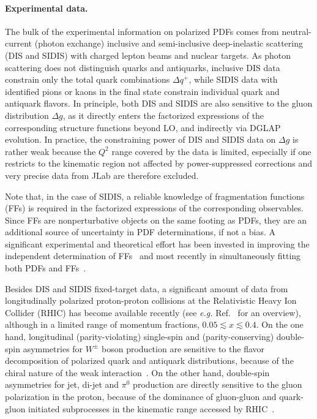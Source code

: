 \paragraph*{Experimental data.}
The bulk of the experimental information on polarized PDFs comes from 
neutral-current (photon exchange) inclusive and semi-inclusive deep-inelastic
scattering (DIS and SIDIS) with charged lepton beams and nuclear targets. 
%
As photon scattering does not distinguish quarks and antiquarks, inclusive DIS 
data constrain only the total quark combinations $\Delta q^+$, 
while SIDIS data with identified pions or kaons in the final state 
constrain individual quark and antiquark flavors. 
%
In principle, both DIS and SIDIS are also sensitive to the gluon 
distribution $\Delta g$, as it directly enters the factorized expressions of
the corresponding structure functions beyond LO, and indirectly via DGLAP 
evolution.
%
In practice, the constraining power of DIS and SIDIS data on $\Delta g$ is 
rather weak because the $Q^2$ range covered by the data is limited,
especially if one restricts to the kinematic region not affected by
power-suppressed corrections and very precise data from JLab are therefore
excluded. 

Note that, in the case of SIDIS, a reliable knowledge of fragmentation 
functions (FFs) is required in the factorized expressions of the 
corresponding observables. 
%
Since FFs are nonperturbative objects on the same footing as PDFs, they are 
an additional source of uncertainty in PDF determinations, if not a bias.
%
A significant experimental and theoretical effort has been
invested in improving the independent determination of 
FFs~\cite{deFlorian:2014xna,deFlorian:2017lwf,
Hirai:2016loo,Sato:2016wqj,Bertone:2017tyb} and most recently in simultaneously 
fitting both PDFs and FFs~\cite{Ethier:2017zbq,Borsa:2017vwy}.

Besides DIS and SIDIS fixed-target data, a significant amount of data from
longitudinally polarized proton-proton collisions at the Relativistic 
Heavy Ion Collider (RHIC) has become available recently (see {\it e.g.} 
Ref.~\cite{Aschenauer:2015eha} for an overview), although in a limited range 
of momentum fractions, $0.05\lesssim x \lesssim 0.4$.
%
On the one hand, longitudinal (parity-violating) single-spin and 
(parity-conserving) double-spin asymmetries for $W^\pm$ boson production are 
sensitive to the flavor decomposition of polarized quark and antiquark 
distributions, because of the chiral nature of the weak 
interaction~\cite{Bourrely:1993dd}. 
%
On the other hand, double-spin asymmetries for jet, di-jet and $\pi^0$ 
production are directly sensitive to the gluon polarization in 
the proton, because of the dominance of gluon-gluon and quark-gluon initiated 
subprocesses in the kinematic range accessed by RHIC~\cite{Bourrely:1990pz}.

